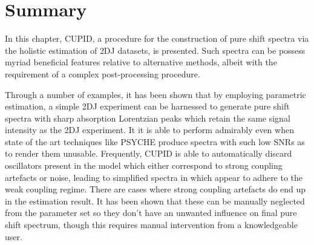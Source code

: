 \section{Summary}
In this chapter, \ac{CUPID}, a procedure for the construction of pure shift
spectra via the holistic estimation of \ac{2DJ} datasets, is presented.
Such spectra can be possess myriad beneficial features relative to alternative
methods, albeit with the requirement of a complex post-processing procedure.



Through a number of examples, it has been shown that by employing parametric
estimation, a simple \ac{2DJ} experiment can be harnessed to generate pure
shift spectra with sharp absorption Lorentzian peaks which retain the same
signal intensity as the \ac{2DJ} experiment. It it is able to perform
admirably even when state of the art techniques like \ac{PSYCHE} produce
spectra with such low \acp{SNR} as to render them unusable. Frequently, \ac{CUPID}
is able to automatically discard oscillators present in the model which either
correspond to strong coupling artefacts or noise, leading to simplified spectra
in which appear to adhere to the weak coupling regime. There are cases where
strong coupling artefacts do end up in the estimation result. It has been shown
that these can be manually neglected from the parameter set so they don't have
an unwanted influence on final pure shift spectrum, though this requires manual
intervention from a knowledgeable user.

